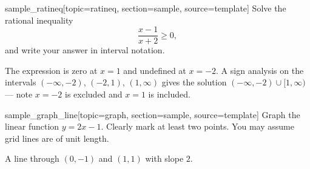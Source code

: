 \begin{problem}{sample_ratineq}[topic=ratineq, section=sample, source=template]
	Solve the rational inequality
	\[ \frac{x - 1}{x + 2} \ge 0, \]
	and write your answer in interval notation.
	\begin{solution}
	The expression is zero at $x = 1$ and undefined at $x = -2$. A sign
	analysis on the intervals $(-\infty, -2)$, $(-2, 1)$, $(1, \infty)$
	gives the solution $(-\infty, -2) \cup [1, \infty)$ — note $x = -2$
	is excluded and $x = 1$ is included.
	\end{solution}
\end{problem}

\begin{problem}{sample_graph_line}[topic=graph, section=sample, source=template]
	Graph the linear function $y = 2x - 1$. Clearly mark at least two
	points. You may assume grid lines are of unit length.
	\begin{center}
	\end{center}
	\begin{solution}
	A line through $(0, -1)$ and $(1, 1)$ with slope $2$.
	\end{solution}
\end{problem}

